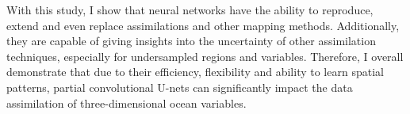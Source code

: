 \documentclass[Masterarbeit.tex]{subfile}
\begin{document}
	With this study, I show that neural networks have the ability to reproduce, extend and even replace assimilations and other mapping methods. Additionally, they are capable of giving insights into the uncertainty of other assimilation techniques, especially for undersampled regions and variables. Therefore, I overall demonstrate that due to their efficiency, flexibility and ability to learn spatial patterns, partial convolutional U-nets can significantly impact the data assimilation of three-dimensional ocean variables.\\
	
	
	
	
	
	
\end{document}

